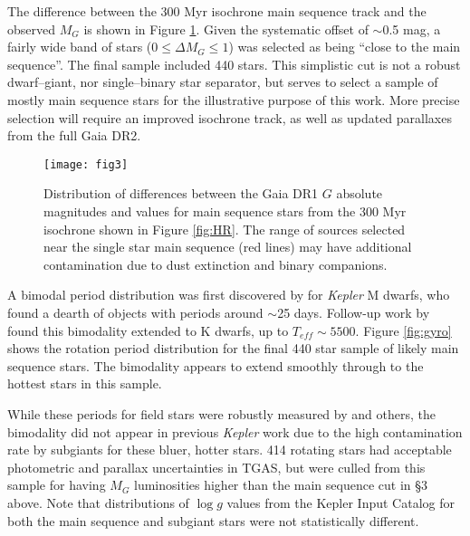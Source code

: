 \documentclass[manuscript, letterpaper]{aastex6}
\makeatletter
\let\origsection\section
\renewcommand\section{\@ifstar{\starsection}{\nostarsection}}
\newcommand\nostarsection[1]{\sectionprelude\origsection{#1}}
\newcommand\starsection[1]{\sectionprelude\origsection*{#1}}
\newcommand\sectionprelude{\vspace{1em}}
\newcommand{\Kepler}{\textsl{Kepler}\xspace}
\makeatother
\begin{document}
The difference between the 300 Myr isochrone main sequence track and the observed $M_G$ is shown in Figure \ref{fig:hist}. Given the systematic offset of $\sim$0.5 mag, a fairly wide band of stars ($0\le \Delta M_G \le 1$) was selected as being ``close to the main sequence''. The final sample included 440 stars. This simplistic cut is not a robust dwarf--giant, nor single--binary star separator, but serves to select a sample of mostly main sequence stars for the illustrative purpose of this work. More precise selection will require an improved isochrone track, as well as updated parallaxes from the full Gaia DR2.




\begin{figure}[]
\centering
\texttt{[image: fig3]}
\caption{Distribution of differences between the Gaia DR1 $G$ absolute magnitudes and values for main sequence stars from the 300 Myr isochrone shown in Figure \ref{fig:HR}. The range of sources selected near the single star main sequence (red lines) may have additional contamination due to dust extinction and binary companions.}
\label{fig:hist}
\end{figure}








\section{Extending the Spin-Down Gap}
A bimodal period distribution was first discovered by \citet{mcquillan2013} for \Kepler M dwarfs, who found a dearth of objects with periods around $\sim$25 days. Follow-up work by \citet{mcquillan2014} found this bimodality extended to K dwarfs, up to $T_{eff}\sim5500$. Figure \ref{fig:gyro} shows the rotation period distribution for the final 440 star sample of likely main sequence stars. The bimodality appears to extend smoothly through to the hottest stars in this sample. 

While these periods for field stars were robustly measured by \citet{mcquillan2014} and others, the bimodality did not appear in previous \Kepler work due to the high contamination rate by subgiants for these bluer, hotter stars.  414 rotating stars had acceptable photometric and parallax uncertainties in TGAS, but were culled from this sample for having $M_G$ luminosities higher than the main sequence cut in \S3 above. Note that distributions of $\log g$ values from the Kepler Input Catalog \citep{brown2011a} for both the main sequence and subgiant stars were not statistically different.
\end{document}
